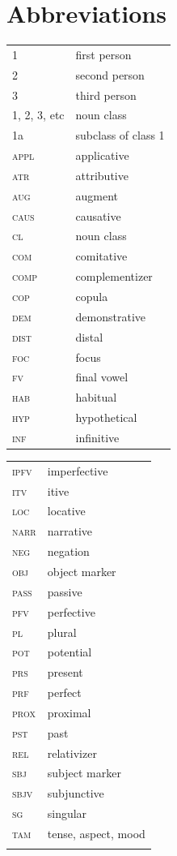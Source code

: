 \documentclass[output=paper,colorlinks,citecolor=brown,draftmode]{langscibook}
\begin{document}
\section*{Abbreviations}
\largerpage
\begin{tabularx}{.45\textwidth}{lQ}
1 & first person \\
2 & second person \\
3 & third person \\
1, 2, 3, etc & noun class \\
1a & subclass of class 1\\
\textsc{appl}&applicative \\
\textsc{atr}&attributive \\ 
\textsc{aug}& augment \\ 
\textsc{caus}& causative\\ 
\textsc{cl}& noun class\\ 
\textsc{com}& comitative\\ 
\textsc{comp}& complementizer\\ 
\textsc{cop}& copula\\ 
\textsc{dem}&demonstrative \\ 
\textsc{dist}& distal\\ 
\textsc{foc}&focus\\ 
\textsc{fv}&final vowel \\ 
\textsc{hab}&habitual \\ 
\textsc{hyp}&hypothetical \\ 
\textsc{inf}&infinitive \\ 
\end{tabularx}
\begin{tabularx}{.45\textwidth}{lQ}
\textsc{ipfv}&imperfective \\
\textsc{itv}&itive \\
\textsc{loc} & locative \\
\textsc{narr}&narrative \\
\textsc{neg}&negation \\ 
\textsc{obj}&object marker \\ 
\textsc{pass}&passive \\ 
\textsc{pfv}&perfective \\
\textsc{pl}&plural \\
\textsc{pot}&potential \\ 
\textsc{prs}&present \\ 
\textsc{prf}&perfect \\ 
\textsc{prox}&proximal \\ 
\textsc{pst}&past \\ 
\textsc{rel}&relativizer \\
\textsc{sbj}&subject marker \\ 
\textsc{sbjv}&subjunctive \\ 
\textsc{sg}&singular \\ 
\textsc{tam}&tense, aspect, mood \\
\\
\end{tabularx}


\printbibliography[heading=subbibliography,notkeyword=this]
\end{document}
